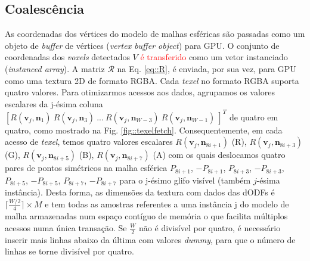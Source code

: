 \subsection{Coalescência}
\label{ssec::coalescencia}


As coordenadas dos vértices do modelo de malhas esféricas são passadas como um objeto de \textit{buffer} de vértices (\textit{vertex buffer object}) para GPU. O conjunto de coordenadas dos \textit{voxels} detectados $V$ \textcolor{red}{é transferido }como um vetor instanciado (\textit{instanced array}). A matriz $\boldsymbol{\mathscr{R}}$ na Eq. \ref{eq::R}, é enviada, por sua vez, para GPU como uma textura 2D de formato RGBA. Cada \textit{texel} no formato RGBA suporta quatro valores. Para otimizarmos acessos aos dados, agrupamos os valores escalares da j-ésima coluna $[
R(\mathbf{v}_{j}, \mathbf{n}_1) ~
R(\mathbf{v}_{j}, \mathbf{n}_3) ~ ... ~
R(\mathbf{v}_{j}, \mathbf{n}_{W-3}) ~
R(\mathbf{v}_{j}, \mathbf{n}_{W-1}) ~
]^T$ de quatro em quatro, como mostrado na Fig. \ref{fig::texelfetch}. Consequentemente, em cada acesso de \textit{texel}, temos quatro valores escalares $
R(\mathbf{v}_{j}, \mathbf{\mathbf{n}}_{8i+1})$ (R), $
R(\mathbf{v}_{j}, \mathbf{\mathbf{n}}_{8i+3})$ (G), $
R(\mathbf{v}_{j}, \mathbf{\mathbf{n}}_{8i+5})$ (B), $
R(\mathbf{v}_{j}, \mathbf{\mathbf{n}}_{8i+7})$ (A) com os quais deslocamos quatro pares de pontos simétricos na malha esférica $P_{8i+1}$, $-P_{8i+1}$, $P_{8i+3}$, $-P_{8i+3}$, $P_{8i+5}$, $-P_{8i+5}$, $P_{8i+7}$, $-P_{8i+7}$ para o j-ésimo glifo visível (também $j$-ésima instância). Desta forma, as dimensões da textura com dados das dODFs é $ \lceil \frac{W/2}{4} \rceil \times M$ e tem todas as amostras referentes a uma instância j do modelo de malha armazenadas num espaço contíguo de memória o que facilita múltiplos acessos numa única transação. Se $\frac{W}{2}$ não é divisível por quatro, é necessário inserir mais linhas abaixo da última com valores \textit{dummy}, para que o número de linhas se torne divisível por quatro.

